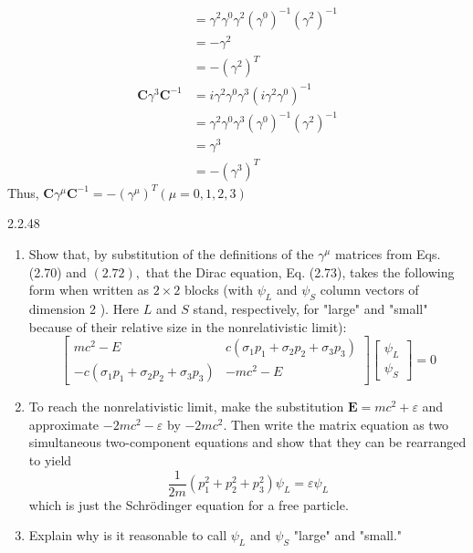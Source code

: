 \documentclass{article}
\begin{document}
\begin{flushleft}
$$\begin{aligned}
&=\gamma^{2} \gamma^{0} \gamma^{2}\left(\gamma^{0}\right)^{-1}\left(\gamma^{2}\right)^{-1} \\
&=-\gamma^{2} \\
&=-\left(\gamma^{2}\right)^{T} \\
\mathbf{C} \gamma^{3} \mathbf{C}^{-1} &=i \gamma^{2} \gamma^{0} \gamma^{3}\left(i \gamma^{2} \gamma^{0}\right)^{-1} \\
&=\gamma^{2} \gamma^{0} \gamma^{3}\left(\gamma^{0}\right)^{-1}\left(\gamma^{2}\right)^{-1} \\
&=\gamma^{3} \\
&=-\left(\gamma^{3}\right)^{T}
\end{aligned}
$$
Thus, $\mathbf{C} \gamma^{\mu} \mathbf{C}^{-1}=-\left(\gamma^{\mu}\right)^{T}(\mu=0,1,2,3)$

\newpage


\begin{mybox}{2.2.48}
\begin{enumerate}[$(a)$]
\item Show that, by substitution of the definitions of the $\gamma^{\mu}$ matrices from Eqs. (2.70) and $(2.72),$ that the Dirac equation, Eq. (2.73), takes the following form when written as $2 \times 2$ blocks (with $\psi_{L}$ and $\psi_{S}$ column vectors of dimension 2 ). Here $L$ and $S$ stand, respectively, for "large" and "small" because of their relative size in the nonrelativistic limit):
$$
\begin{bmatrix}
m c^{2}-E & c\left(\sigma_{1} p_{1}+\sigma_{2} p_{2}+\sigma_{3} p_{3}\right) \\
-c\left(\sigma_{1} p_{1}+\sigma_{2} p_{2}+\sigma_{3} p_{3}\right) & -m c^{2}-E
\end{bmatrix}\begin{bmatrix}
\psi_{L} \\
\psi_{S}
\end{bmatrix}=0
$$
\item To reach the nonrelativistic limit, make the substitution $\mathbf{E}=m c^{2}+\varepsilon$ and approximate $-2 m c^{2}-\varepsilon$ by $-2 m c^{2}$. Then write the matrix equation as two simultaneous two-component equations and show that they can be rearranged to yield
$$
\frac{1}{2 m}\left(p_{1}^{2}+p_{2}^{2}+p_{3}^{2}\right) \psi_{L}=\varepsilon \psi_{L}
$$
which is just the Schrödinger equation for a free particle.
\item Explain why is it reasonable to call $\psi_{L}$ and $\psi_{S}$ "large" and "small."
\end{enumerate}
\end{mybox}




\end{flushleft}
\end{document}
